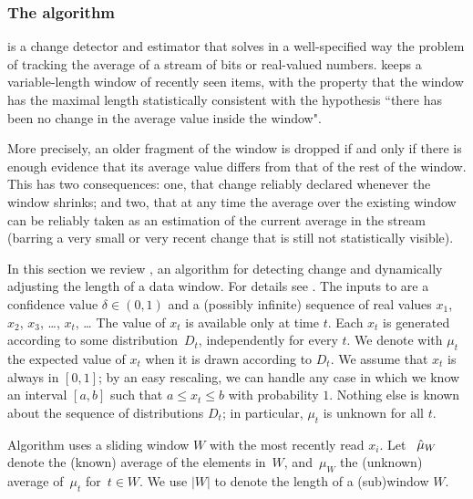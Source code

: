 \subsubsection{The \adwin algorithm}
\label{sAdwin}

\adwin is a change detector and estimator that solves in a well-specified way the problem
of tracking the average of a stream of bits or real-valued numbers.
\adwin keeps a variable-length window of recently seen items, with the property 
that the window has the maximal length statistically consistent 
with the hypothesis ``there has been no change in the average value inside the window". 

More precisely, an older fragment of the window is dropped if and only if 
there is enough evidence that its average value differs from that of 
the rest of the window. 
This has two consequences: one, that change reliably declared whenever
the window shrinks; and two, that at any time the average over the existing
window can be reliably taken as an estimation of the current average in the stream
(barring a very small or very recent change that is still not statistically 
visible).%


\label{Sadwin}

In this section we review \adwinb, an algorithm for %
detecting change%
and dynamically adjusting the length of a data window. For details see \cite{bif-gav}.
The inputs to \adwin are a confidence value $\delta\in (0,1)$ 
and a (possibly infinite) sequence of real values 
$x_1$, $x_2$, $x_3$, \dots, $x_t$, \dots{} 
The value of $x_t$ is available only at time $t$.
Each $x_t$ is generated according to some distribution~$D_t$, 
independently for every $t$. 
We denote with $\mu_t$ 
the expected value 
of 
$x_t$ when it is drawn according to $D_t$. 
We assume that $x_t$ is always in $[0,1]$; by an easy
rescaling, we can handle any case in which we know an interval 
$[a,b]$ such that $a \le x_t \le b$ with probability $1$. 
Nothing else is known about the sequence of 
distributions $D_t$; in particular, 
$\mu_t$ 
is unknown for all $t$. 

Algorithm \adwin uses a sliding window $W$ with the most recently read 
$x_i$. Let~%
$\hat{\mu}_W$ denote the (known) average of the elements in~$W$, 
and~$\mu_W$ the (unknown) average of~$\mu_t$ for~$t\in W$. 
We use $|W|$ to denote the length of a (sub)window $W$. 

